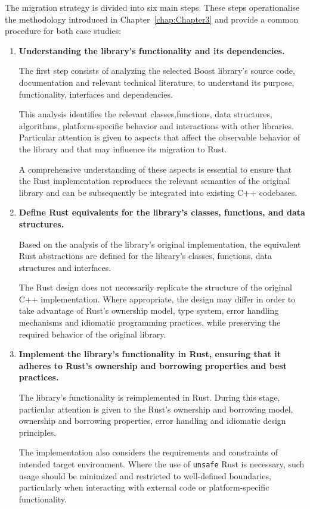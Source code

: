 The migration strategy is divided into six main steps. These steps operationalise the methodology introduced in Chapter~\ref{chap:Chapter3} and provide a common procedure for both case studies:
\begin{enumerate}
\item \textbf{Understanding the library's functionality and its dependencies.}

The first step consists of analyzing the selected Boost library's source code, documentation and 
relevant technical literature, to understand its purpose, functionality, interfaces and dependencies.

This analysis identifies the relevant classes,functions, data structures, algorithms, platform-specific
behavior and interactions with other libraries.
Particular attention is given to aspects that affect the observable behavior of the library and that may influence its migration to Rust.

A comprehensive understanding of these aspects is essential to ensure that the Rust implementation reproduces the relevant
semantics of the original library and can be subsequently be integrated into existing C++ codebases.

\item \textbf{Define Rust equivalents for the library's classes, functions, and data structures.}

Based on the analysis of the library's original implementation, the equivalent Rust abstractions
are defined for the library's classes, functions, data structures and interfaces. 

The Rust design does not necessarily replicate the structure of the original C++ implementation. 
Where appropriate, the design may differ in order to take advantage of Rust's ownership model,
type system, error handling mechanisms and idiomatic programming practices, while preserving the required behavior of the original library.

\item \textbf{Implement the library's functionality in Rust, ensuring that it adheres to Rust's ownership and borrowing properties 
and best practices.}

The library's functionality is reimplemented in Rust. During this stage, particular attention is given to the Rust's ownership
and borrowing model, ownership and borrowing properties, error handling and idiomatic design principles. 

The implementation also considers the requirements and constraints of intended target environment.
Where the use of \texttt{unsafe} Rust is necessary, such usage should be minimized and restricted to well-defined boundaries, 
particularly when interacting with external code or platform-specific functionality.


\end{enumerate}
